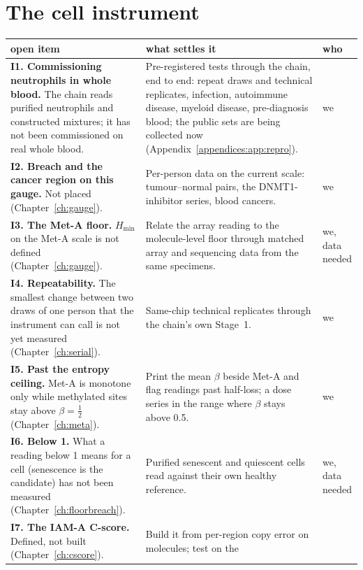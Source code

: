 \section{The cell instrument}
{\small\begin{longtable}{@{}>{\raggedright\arraybackslash}p{}>{\raggedright\arraybackslash}p{}>{\raggedright\arraybackslash}p{}@{}}
\toprule
open item & what settles it & who \\\midrule\endhead
\textbf{I1. Commissioning neutrophils in whole blood.} The chain reads purified neutrophils and constructed mixtures; it has not been
 commissioned on real whole blood. & Pre-registered tests through the chain, end to end: repeat draws and technical replicates, infection, autoimmune
 disease, myeloid disease, pre-diagnosis blood; the public sets are being collected now (Appendix~\ref{appendices:app:repro}). & we \\\cmidrule[0.2pt]{1-3}
\textbf{I2. Breach and the cancer region on this gauge.} Not placed (Chapter~\ref{ch:gauge}).
 & Per-person data on the current scale: tumour--normal pairs, the DNMT1-inhibitor series, blood cancers. & we \\\cmidrule[0.2pt]{1-3}
\textbf{I3. The Met-A floor.} $H_{\min}$ on the Met-A scale is not defined (Chapter~\ref{ch:gauge}). & Relate the array reading to the
 molecule-level floor through matched array and sequencing data from the same specimens. & we, data needed \\\cmidrule[0.2pt]{1-3}
\textbf{I4. Repeatability.} The smallest change between two draws of one person that the instrument can call is not yet measured (Chapter~\ref{ch:serial}). & Same-chip technical replicates through the
 chain's own Stage~1. & we \\\cmidrule[0.2pt]{1-3}
\textbf{I5. Past the entropy ceiling.} Met-A is monotone only while methylated sites stay above $\beta=\tfrac12$ (Chapter~\ref{ch:meta}).
 & Print the mean $\beta$ beside Met-A and flag readings past half-loss; a dose series in the range where $\beta$ stays above 0.5. & we \\\cmidrule[0.2pt]{1-3}
\textbf{I6. Below 1.} What a reading below 1 means for a cell (senescence is the candidate) has not been measured (Chapter~\ref{ch:floorbreach}).
 & Purified senescent and quiescent cells read against their own healthy reference. & we, data needed \\\cmidrule[0.2pt]{1-3}
\textbf{I7. The IAM-A C-score.} Defined, not built (Chapter~\ref{ch:cscore}). & Build it from per-region copy error on molecules; test on the

\end{longtable}}
